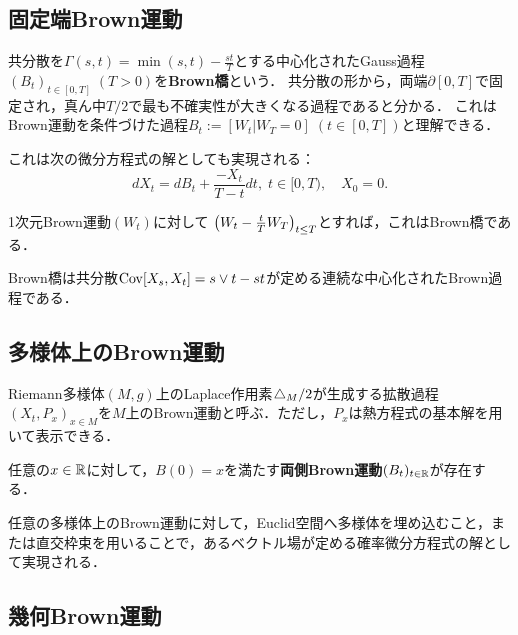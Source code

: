 \documentclass[uplatex,dvipdfmx]{jsreport}
\begin{document}
\subsection{固定端Brown運動}

\begin{definition}
    共分散を$\Gamma(s,t)=\min(s,t)-\frac{st}{T}$とする中心化されたGauss過程$(B_t)_{t\in[0,T]}\;(T>0)$を\textbf{Brown橋}という．
    共分散の形から，両端$\partial[0,T]$で固定され，真ん中$T/2$で最も不確実性が大きくなる過程であると分かる．
    これはBrown運動を条件づけた過程$B_t:=[W_t|W_T=0]\;(t\in[0,T])$と理解できる．
\end{definition}
\begin{remarks}
    これは次の微分方程式の解としても実現される：
    \[dX_t=dB_t+\frac{-X_t}{T-t}dt,\;t\in[0,T),\quad X_0=0.\]
\end{remarks}

\begin{construction}
    1次元Brown運動$(W_t)$に対して
    $\left(W_t-\frac{t}{T}W_T\right)_{t\le T}$とすれば，これはBrown橋である．
\end{construction}

\begin{proposition}
    Brown橋は共分散$\mathrm{Cov}[X_s,X_t]=s\lor t-st$が定める連続な中心化されたBrown過程である．
\end{proposition}

\subsection{多様体上のBrown運動}

\begin{definition}
    Riemann多様体$(M,g)$上のLaplace作用素$\mathop{}\!\mathbin\bigtriangleup_M/2$が生成する拡散過程$(X_t,P_x)_{x\in M}$を$M$上のBrown運動と呼ぶ．ただし，$P_x$は熱方程式の基本解を用いて表示できる．
\end{definition}

\begin{proposition}
    任意の$x\in\mathbb{R}$に対して，$B(0)=x$を満たす\textbf{両側Brown運動}$(B_t)_{t\in\mathbb{R}}$が存在する．
\end{proposition}

\begin{proposition}
    任意の多様体上のBrown運動に対して，Euclid空間へ多様体を埋め込むこと，または直交枠束を用いることで，あるベクトル場が定める確率微分方程式の解として実現される．
\end{proposition}

\subsection{幾何Brown運動}
\end{document}
